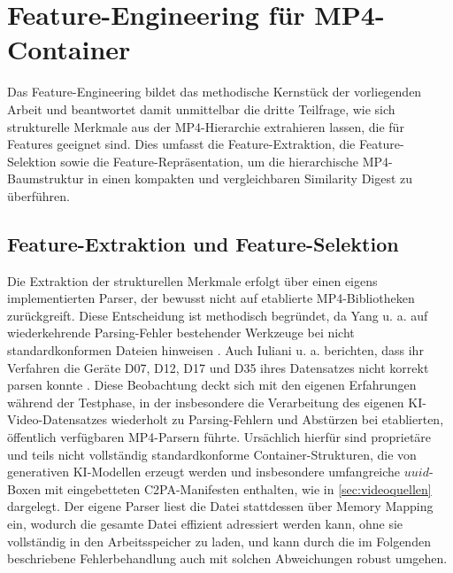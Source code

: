 \section{Feature-Engineering für MP4-Container}
\label{sec:feature}

Das Feature-Engineering bildet das methodische Kernstück der vorliegenden Arbeit und beantwortet damit unmittelbar die dritte Teilfrage, wie sich strukturelle Merkmale aus der MP4-Hierarchie extrahieren lassen, die für Features geeignet sind. Dies umfasst die Feature-Extraktion, die Feature-Selektion sowie die Feature-Repräsentation, um die hierarchische MP4-Baumstruktur in einen kompakten und vergleichbaren Similarity Digest zu überführen.


\subsection{Feature-Extraktion und Feature-Selektion}
\label{sec:featureex}

Die Extraktion der strukturellen Merkmale erfolgt über einen eigens implementierten Parser, der bewusst nicht auf etablierte MP4-Bibliotheken zurückgreift. Diese Entscheidung ist methodisch begründet, da Yang u. a. auf wiederkehrende Parsing-Fehler bestehender Werkzeuge bei nicht standardkonformen Dateien hinweisen \cite[Kap. 5.4]{yang_comprehensive_2025}. Auch Iuliani u. a. berichten, dass ihr Verfahren die Geräte D07, D12, D17 und D35 ihres Datensatzes nicht korrekt parsen konnte \cite[Kap. 4]{iuliani_video_2019}. Diese Beobachtung deckt sich mit den eigenen Erfahrungen während der Testphase, in der insbesondere die Verarbeitung des eigenen KI-Video-Datensatzes wiederholt zu Parsing-Fehlern und Abstürzen bei etablierten, öffentlich verfügbaren MP4-Parsern führte. Ursächlich hierfür sind proprietäre und teils nicht vollständig standardkonforme Container-Strukturen, die von generativen KI-Modellen erzeugt werden und insbesondere umfangreiche \(uuid\)-Boxen mit eingebetteten C2PA-Manifesten enthalten, wie in \cref{sec:videoquellen} dargelegt. Der eigene Parser liest die Datei stattdessen über Memory Mapping ein, wodurch die gesamte Datei effizient adressiert werden kann, ohne sie vollständig in den Arbeitsspeicher zu laden, und kann durch die im Folgenden beschriebene Fehlerbehandlung auch mit solchen Abweichungen robust umgehen.

